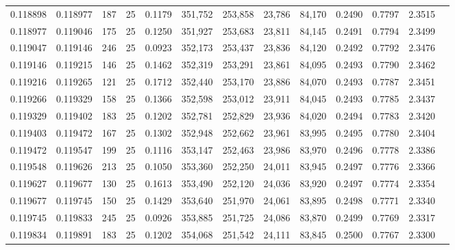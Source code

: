 \begin{tabular}{rrrrrrrrrrrrr}
0.118898 & 0.118977 &   187 &  25 &                                     0.1179 & 351,752 & 253,858 &  23,786 &  84,170 & 0.2490 & 0.7797 & 2.3515 \\
0.118977 & 0.119046 &   175 &  25 &                                     0.1250 & 351,927 & 253,683 &  23,811 &  84,145 & 0.2491 & 0.7794 & 2.3499 \\
0.119047 & 0.119146 &   246 &  25 &                                     0.0923 & 352,173 & 253,437 &  23,836 &  84,120 & 0.2492 & 0.7792 & 2.3476 \\
0.119146 & 0.119215 &   146 &  25 &                                     0.1462 & 352,319 & 253,291 &  23,861 &  84,095 & 0.2493 & 0.7790 & 2.3462 \\
0.119216 & 0.119265 &   121 &  25 &                                     0.1712 & 352,440 & 253,170 &  23,886 &  84,070 & 0.2493 & 0.7787 & 2.3451 \\
0.119266 & 0.119329 &   158 &  25 &                                     0.1366 & 352,598 & 253,012 &  23,911 &  84,045 & 0.2493 & 0.7785 & 2.3437 \\
0.119329 & 0.119402 &   183 &  25 &                                     0.1202 & 352,781 & 252,829 &  23,936 &  84,020 & 0.2494 & 0.7783 & 2.3420 \\
0.119403 & 0.119472 &   167 &  25 &                                     0.1302 & 352,948 & 252,662 &  23,961 &  83,995 & 0.2495 & 0.7780 & 2.3404 \\
0.119472 & 0.119547 &   199 &  25 &                                     0.1116 & 353,147 & 252,463 &  23,986 &  83,970 & 0.2496 & 0.7778 & 2.3386 \\
0.119548 & 0.119626 &   213 &  25 &                                     0.1050 & 353,360 & 252,250 &  24,011 &  83,945 & 0.2497 & 0.7776 & 2.3366 \\
0.119627 & 0.119677 &   130 &  25 &                                     0.1613 & 353,490 & 252,120 &  24,036 &  83,920 & 0.2497 & 0.7774 & 2.3354 \\
0.119677 & 0.119745 &   150 &  25 &                                     0.1429 & 353,640 & 251,970 &  24,061 &  83,895 & 0.2498 & 0.7771 & 2.3340 \\
0.119745 & 0.119833 &   245 &  25 &                                     0.0926 & 353,885 & 251,725 &  24,086 &  83,870 & 0.2499 & 0.7769 & 2.3317 \\
0.119834 & 0.119891 &   183 &  25 &                                     0.1202 & 354,068 & 251,542 &  24,111 &  83,845 & 0.2500 & 0.7767 & 2.3300 \\

\end{tabular}
